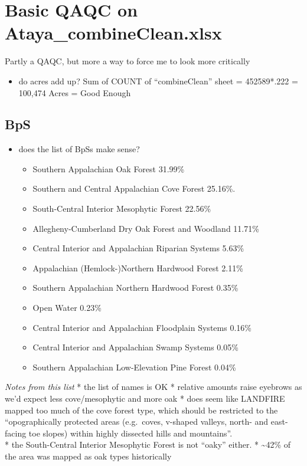 \documentclass[
]{book}
\providecommand{\tightlist}{%
  \setlength{\itemsep}{0pt}\setlength{\parskip}{0pt}}
\begin{document}
\hypertarget{basic-qaqc-on-ataya_combineclean.xlsx}{%
\chapter{Basic QAQC on Ataya\_combineClean.xlsx}\label{basic-qaqc-on-ataya_combineclean.xlsx}}

Partly a QAQC, but more a way to force me to look more critically

\begin{itemize}
\tightlist
\item
  do acres add up? Sum of COUNT of ``combineClean'' sheet = 452589*.222 = 100,474 Acres = Good Enough
\end{itemize}

\hypertarget{bps}{%
\section{BpS}\label{bps}}

\begin{itemize}
\item
  does the list of BpSs make sense?

  \begin{itemize}
  \tightlist
  \item
    Southern Appalachian Oak Forest 31.99\%
  \item
    Southern and Central Appalachian Cove Forest 25.16\%.\\
  \item
    South-Central Interior Mesophytic Forest 22.56\%
  \item
    Allegheny-Cumberland Dry Oak Forest and Woodland 11.71\%
  \item
    Central Interior and Appalachian Riparian Systems 5.63\%
  \item
    Appalachian (Hemlock-)Northern Hardwood Forest 2.11\%
  \item
    Southern Appalachian Northern Hardwood Forest 0.35\%
  \item
    Open Water 0.23\%
  \item
    Central Interior and Appalachian Floodplain Systems 0.16\%
  \item
    Central Interior and Appalachian Swamp Systems 0.05\%
  \item
    Southern Appalachian Low-Elevation Pine Forest 0.04\%
  \end{itemize}
\end{itemize}

\emph{Notes from this list}
* the list of names is OK
* relative amounts raise eyebrows as we'd expect less cove/mesophytic and more oak
* does seem like LANDFIRE mapped too much of the cove forest type, which should be restricted to the ``opographically protected areas (e.g.~coves, v-shaped valleys, north- and east-facing toe slopes) within highly dissected hills and mountains''.\\
* the South-Central Interior Mesophytic Forest is not ``oaky'' either.
* \textasciitilde42\% of the area was mapped as oak types historically
\end{document}
